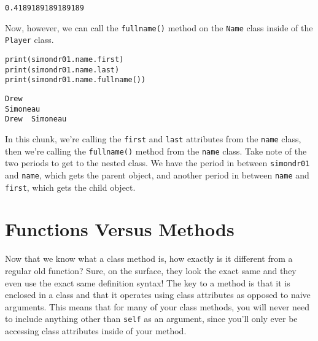 \begin{lstlisting}[style=none]
0.4189189189189189
\end{lstlisting}
Now, however, we can call the \verb|fullname()| method on the \verb|Name| class inside of the \verb|Player| class.
\begin{lstlisting}[style=pippython]
print(simondr01.name.first)
print(simondr01.name.last)
print(simondr01.name.fullname())
\end{lstlisting}
\begin{lstlisting}[style=none]
Drew
Simoneau
Drew  Simoneau
\end{lstlisting}
In this chunk, we're calling the \verb|first| and \verb|last| attributes from the \verb|name| class, then we're calling the \verb|fullname()| method from the \verb|name| class. Take note of the two periods to get to the nested class. We have the period in between \verb|simondr01| and \verb|name|, which gets the parent object, and another period in between \verb|name| and \verb|first|, which gets the child object.
\section{Functions Versus Methods}
Now that we know what a class method is, how exactly is it different from a regular old function? Sure, on the surface, they look the exact same and they even use the exact same definition syntax! The key to a method is that it is enclosed in a class and that it operates using class attributes as opposed to naive arguments. This means that for many of your class methods, you will never need to include anything other than \verb|self| as an argument, since you'll only ever be accessing class attributes inside of your method. 
